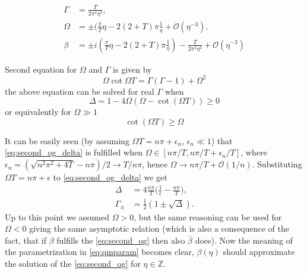 \documentclass[
a4paper,%
10pt,%
titlepage,%
twoside%
]{article}
\begin{document}
\begin{align}\label{eq:qmparam}
  \Gamma&=\frac{T}{2\pi^2\eta^2},\\
  \Omega&=\pm(\frac{\pi}{T}\eta-2(2+T)\pi\frac{1}{\eta}+\mathcal{O}(\eta^{-3}),\\
  \beta&=\pm i(\frac{\pi}{T}\eta-2(2+T)\pi\frac{1}{\eta})-\frac{T}{2\pi^2\eta^2}+\mathcal{O}(\eta^{-3})
\end{align}

Second equation for $\Omega$ and $\Gamma$ is given by
\begin{equation}
  \label{eq:second_og}
  \Omega\cot{\Omega T}=\Gamma(\Gamma-1)+\Omega^2
\end{equation}
the above equation can be solved for real $\Gamma$ when
\begin{equation}
  \label{eq:second_og_delta}
  \Delta=1-4\Omega(\Omega-\cot(\Omega T))\ge 0
\end{equation}
or equivalently for $\Omega\gg 1$
\begin{equation}
  \cot(\Omega T)\ge\Omega
\end{equation}

It can be easily seen (by assuming $\Omega T=n\pi+\epsilon_n$,
$\epsilon_n\ll 1$) that \eqref{eq:second_og_delta} is fulfilled when
$\Omega\in[n\pi/T,n\pi/T+\epsilon_n/T]$, where
$\epsilon_n=(\sqrt{n^2\pi^2+4T}-n\pi)/2\rightarrow T/n\pi$, hence
$\Omega\rightarrow n\pi/T+\mathcal{O}(1/n)$. Substituting $\Omega
T=n\pi+\epsilon$ to \eqref{eq:second_og_delta} we get
\begin{align}
  \label{eq:second_og_delta_e}
  \Delta&=4\frac{n\pi}{T}\big(\frac{1}{\epsilon}-\frac{n\pi}{T}),\\
  \Gamma_\pm&=\frac{1}{2}(1\pm\sqrt{\Delta}).
\end{align}
Up to this point we assumed $\Omega>0$, but the same reasoning can be
used for $\Omega<0$ giving the same asymptotic relation (which is also
a consequence of the fact, that if $\beta$ fulfills the
\eqref{eq:second_og} then also $\bar\beta$ does). Now the meaning of
the parametrization in \eqref{eq:qmparam} becomes clear, $\beta(\eta)$
should approximate the solution of the \eqref{eq:second_og} for
$\eta\in\mathbb{Z}$.

\end{document}
